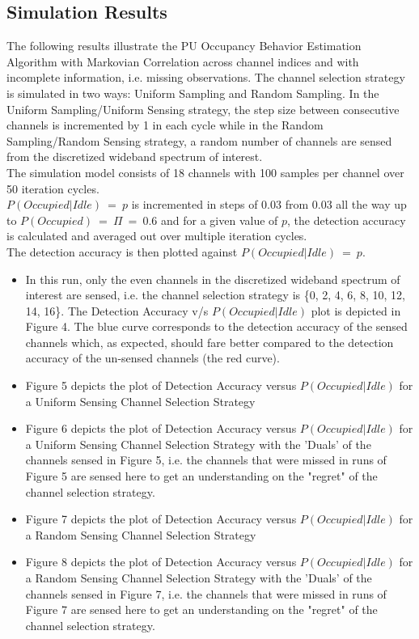 \documentclass[12pt, draftcls, onecolumn]{IEEEtran}
\begin{document}
\subsection{Simulation Results}
The following results illustrate the PU Occupancy Behavior Estimation Algorithm with Markovian Correlation across channel indices and with incomplete information, i.e. missing observations. The channel selection strategy is simulated in two ways: Uniform Sampling and Random Sampling. In the Uniform Sampling/Uniform Sensing strategy, the step size between consecutive channels is incremented by 1 in each cycle while in the Random Sampling/Random Sensing strategy, a random number of channels are sensed from the discretized wideband spectrum of interest.
\\The simulation model consists of 18 channels with 100 samples per channel over 50 iteration cycles.
\\$P(Occupied|Idle)\ =\ p$ is incremented in steps of $0.03$ from $0.03$ all the way up to $P(Occupied)\ =\ \Pi\ =\ 0.6$ and for a given value of $p$, the detection accuracy is calculated and averaged out over multiple iteration cycles.
\\The detection accuracy is then plotted against $P(Occupied|Idle)\ =\ p$.
\begin{itemize}
    \item In this run, only the even channels in the discretized wideband spectrum of interest are sensed, i.e. the channel selection strategy is \{0, 2, 4, 6, 8, 10, 12, 14, 16\}. The Detection Accuracy v/s $P(Occupied|Idle)$ plot is depicted in Figure 4. The blue curve corresponds to the detection accuracy of the sensed channels which, as expected, should fare better compared to the detection accuracy of the un-sensed channels (the red curve).
    \item Figure 5 depicts the plot of Detection Accuracy versus $P(Occupied|Idle)$ for a Uniform Sensing Channel Selection Strategy
    \item Figure 6 depicts the plot of Detection Accuracy versus $P(Occupied|Idle)$ for a Uniform Sensing Channel Selection Strategy with the 'Duals' of the channels sensed in Figure 5, i.e. the channels that were missed in runs of Figure 5 are sensed here to get an understanding on the "regret" of the channel selection strategy.
    \item Figure 7 depicts the plot of Detection Accuracy versus $P(Occupied|Idle)$ for a Random Sensing Channel Selection Strategy
    \item Figure 8 depicts the plot of Detection Accuracy versus $P(Occupied|Idle)$ for a Random Sensing Channel Selection Strategy with the 'Duals' of the channels sensed in Figure 7, i.e. the channels that were missed in runs of Figure 7 are sensed here to get an understanding on the "regret" of the channel selection strategy.
\end{itemize}
\end{document}
